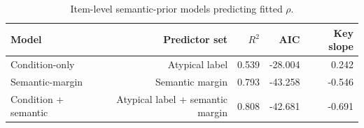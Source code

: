 \begin{table}[htbp]
\centering
\caption{Item-level semantic-prior models predicting fitted $\rho$.}
\label{tab:semantic-models}
\begin{tabular}{l r r r r}
\toprule
Model & Predictor set & $R^2$ & AIC & Key slope \\
\midrule
Condition-only & Atypical label & 0.539 & -28.004 & 0.242 \\
Semantic-margin & Semantic margin & 0.793 & -43.258 & -0.546 \\
Condition + semantic & Atypical label + semantic margin & 0.808 & -42.681 & -0.691 \\
\bottomrule
\end{tabular}
\end{table}
